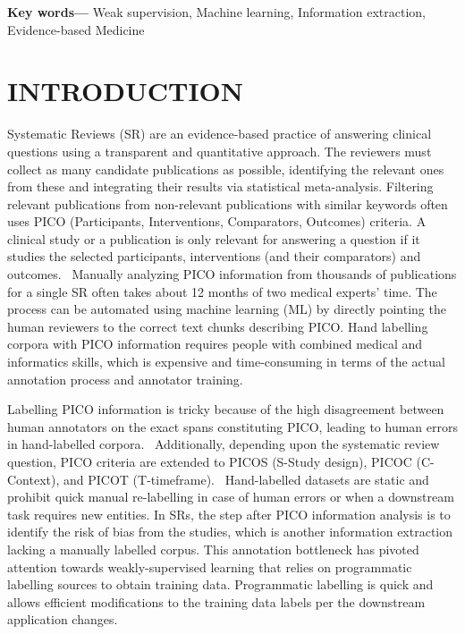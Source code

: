 \documentclass[10.7pt,]{article}
\providecommand{\keywords}[1]
{
  \small	
  \textbf{Key words---} #1
}
\begin{document}
\keywords{Weak supervision, Machine learning, Information extraction, Evidence-based Medicine}
%
\clearpage
%
\section{\textbf{INTRODUCTION}}\label{introduction}
%
Systematic Reviews (SR) are an evidence-based practice of answering clinical questions using a transparent and quantitative approach.
The reviewers must collect as many candidate publications as possible, identifying the relevant ones from these and integrating their results via statistical meta-analysis.
Filtering relevant publications from non-relevant publications with similar keywords often uses PICO (Participants, Interventions, Comparators, Outcomes) criteria. 
A clinical study or a publication is only relevant for answering a question if it studies the selected participants, interventions (and their comparators) and outcomes.~\cite{uman2011systematic} 
Manually analyzing PICO information from thousands of publications for a single SR often takes about 12 months of two medical experts' time.
The process can be automated using machine learning (ML) by directly pointing the human reviewers to the correct text chunks describing PICO.
Hand labelling corpora with PICO information requires people with combined medical and informatics skills, which is expensive and time-consuming in terms of the actual annotation process and annotator training.

Labelling PICO information is tricky because of the high disagreement between human annotators on the exact spans constituting PICO, leading to human errors in hand-labelled corpora.~\cite{brockmeier2019improving}
Additionally, depending upon the systematic review question, PICO criteria are extended to PICOS (S-Study design), PICOC (C-Context), and PICOT (T-timeframe).~\cite{riva2012your,methley2014pico,uman2011systematic}
Hand-labelled datasets are static and prohibit quick manual re-labelling in case of human errors or when a downstream task requires new entities.
In SRs, the step after PICO information analysis is to identify the risk of bias from the studies, which is another information extraction lacking a manually labelled corpus. 
This annotation bottleneck has pivoted attention towards weakly-supervised learning that relies on programmatic labelling sources to obtain training data.
Programmatic labelling is quick and allows efficient modifications to the training data labels per the downstream application changes.
\end{document}
